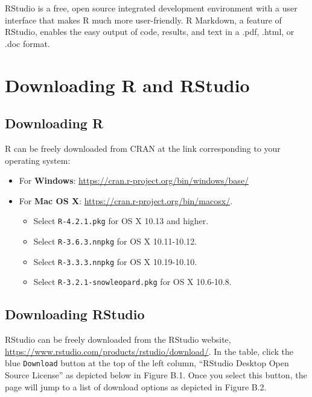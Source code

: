 \documentclass[12pt,]{book}
\providecommand{\tightlist}{%
  \setlength{\itemsep}{0pt}\setlength{\parskip}{0pt}}
\begin{document}
RStudio is a free, open source integrated development environment with a user interface that makes R much more user-friendly. R Markdown, a feature of RStudio, enables the easy output of code, results, and text in a .pdf, .html, or .doc format.

\hypertarget{downloading-r-and-rstudio}{%
\section{Downloading R and RStudio}\label{downloading-r-and-rstudio}}

\hypertarget{downloading-r}{%
\subsection{Downloading R}\label{downloading-r}}

R can be freely downloaded from CRAN at the link corresponding to your operating system:

\begin{itemize}
\tightlist
\item
  For \textbf{Windows}: \url{https://cran.r-project.org/bin/windows/base/}
\item
  For \textbf{Mac OS X}: \url{https://cran.r-project.org/bin/macosx/}.

  \begin{itemize}
  \tightlist
  \item
    Select \texttt{R-4.2.1.pkg} for OS X 10.13 and higher.
  \item
    Select \texttt{R-3.6.3.nnpkg} for OS X 10.11-10.12.
  \item
    Select \texttt{R-3.3.3.nnpkg} for OS X 10.19-10.10.
  \item
    Select \texttt{R-3.2.1-snowleopard.pkg} for OS X 10.6-10.8.
  \end{itemize}
\end{itemize}

\hypertarget{downloading-rstudio}{%
\subsection{Downloading RStudio}\label{downloading-rstudio}}

RStudio can be freely downloaded from the RStudio website, \url{https://www.rstudio.com/products/rstudio/download/}. In the table, click the blue \texttt{Download} button at the top of the left column, ``RStudio Desktop Open Source License'' as depicted below in Figure B.1. Once you select this button, the page will jump to a list of download options as depicted in Figure B.2.
\end{document}

